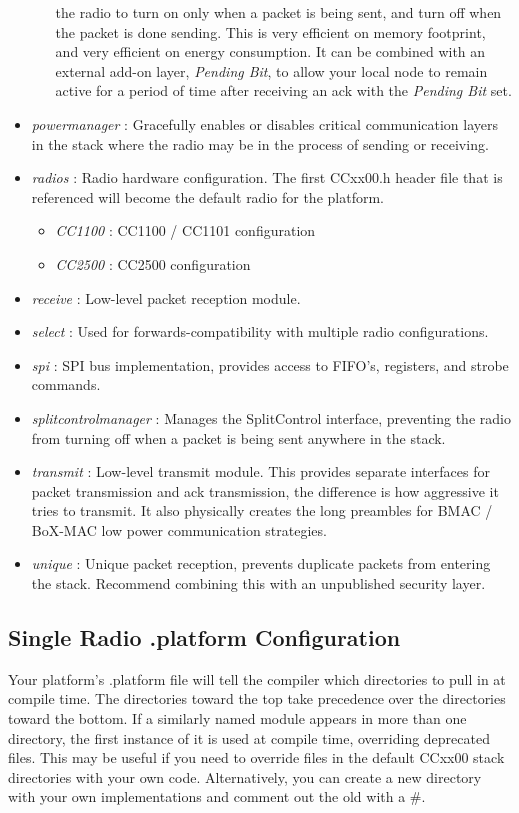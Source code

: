 \documentclass{article}
\begin{document}
\begin{itemize}
\begin{itemize}
	    the radio to turn on only when a packet is being sent, and turn off when
	    the packet is done sending.  This is very efficient on memory footprint, and 
	    very efficient on energy consumption. It can be combined with an external 
	    add-on layer, \emph{Pending Bit}, to allow your local node to remain active 
	    for a period of time after receiving an ack with the \emph{Pending Bit} set.
	  \end{itemize}
	\item \emph{powermanager} : Gracefully enables or disables critical communication 
	layers in the stack where the radio may be in the process of sending or receiving.
	\item \emph{radios} : Radio hardware configuration. The first CCxx00.h header file
	that is referenced will become the default radio for the platform.
	  \begin{itemize}
	    \item \emph{CC1100} : CC1100 / CC1101 configuration
	    \item \emph{CC2500} : CC2500 configuration
	  \end{itemize}
	\item \emph{receive} : Low-level packet reception module.
	\item \emph{select} : Used for forwards-compatibility with multiple radio 
	configurations.
	\item \emph{spi} : SPI bus implementation, provides access to FIFO's, registers, and 
	strobe commands.
	\item \emph{splitcontrolmanager} : Manages the SplitControl interface, preventing
	the radio from turning off when a packet is being sent anywhere in the stack.
	\item \emph{transmit} : Low-level transmit module. This provides separate interfaces 
	for packet transmission and ack transmission, the difference is how aggressive it 
	tries to transmit. It also physically creates the long preambles for BMAC / BoX-MAC 
	low power communication strategies.
	\item \emph{unique} : Unique packet reception, prevents duplicate packets from 
	entering the stack. Recommend combining this with an unpublished security layer.
\end{itemize}

\subsection{Single Radio .platform Configuration}
Your platform's .platform file will tell the compiler which directories to pull in at
compile time.  The directories toward the top take precedence over the directories toward
the bottom.  If a similarly named module appears in more than one directory, the first
instance of it is used at compile time, overriding deprecated files. This may be
useful if you need to override files in the default CCxx00 stack directories with your own
code.  Alternatively, you can create a new directory with your own implementations and
comment out the old with a \#.
\end{document}
